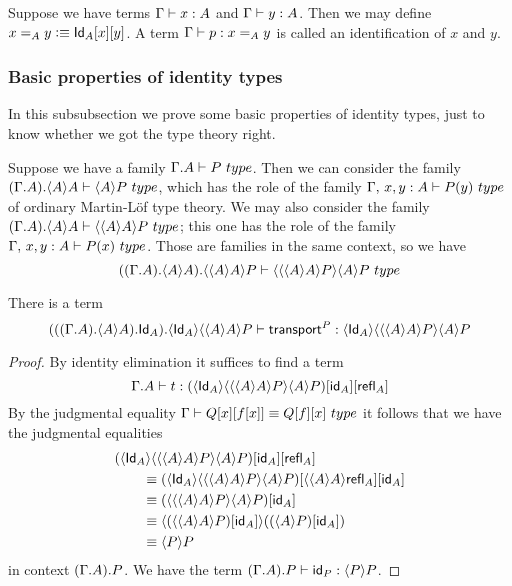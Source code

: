 Suppose we have terms $\jterm{\Gamma}{A}{x}$ and $\jterm{\Gamma}{A}{y}$. Then
we may define $\id[A]{x}{y}\defeq\subst{y}{{x}{\idtypevar{A}}}$. A term
$\jterm{\Gamma}{\id[A]{x}{y}}{p}$ is called an identification of $x$ and $y$.

\subsubsection{Basic properties of identity types}
In this subsubsection we prove some basic properties of identity types, just to
know whether we got the type theory right.

Suppose we have a family $\jtype{\ctxext{\Gamma}{A}}{P}$. Then we can consider
the family $\jtype{\ctxext{{\Gamma}{A}}{\ctxwk{A}{A}}}{\ctxwk{A}{P}}$, which has the role of the family $\jtype{\Gamma,\,x,y:A}{P(y)}$
of ordinary Martin-L\"of type theory. We may also consider the family
$\jtype{\ctxext{{\Gamma}{A}}{\ctxwk{A}{A}}}{\ctxwk{{A}{A}}{P}}$; this one has the
role of the family $\jtype{\Gamma,\,x,y:A}{P(x)}$. Those are families in the
same context, so we have
\begin{equation*}
\jtype{\ctxext{{{\Gamma}{A}}{\ctxwk{A}{A}}}{\ctxwk{{A}{A}}{P}}}{\ctxwk{\ctxwk{{A}{A}}{P}}{{A}{P}}}
\end{equation*}

\begin{lem}
There is a term
\begin{equation*}
\jterm{\ctxext{{{{\Gamma}{A}}{\ctxwk{A}{A}}}{\idtypevar{A}}}{\ctxwk{\idtypevar{A}}{{{A}{A}}{P}}}}{\ctxwk{\idtypevar{A}}{{{{A}{A}}{P}}{{A}{P}}}}{\transfibf{P}}
\end{equation*}
\end{lem}

\begin{proof}
By identity elimination it suffices to find a term
\begin{equation*}
\jterm{\ctxext{\Gamma}{A}}{\subst{\refl{A}}{{\idfunc[A]}{\ctxwk{\idtypevar{A}}{{{{A}{A}}{P}}{{A}{P}}}}}}{t}
\end{equation*}
By the judgmental equality $\jtypeeq{\Gamma}{\subst{{x}{f}}{{x}{Q}}}{\subst{x}{{f}{Q}}}$
it follows that we have the judgmental equalities
\begin{align*}
& \subst{\refl{A}}{{\idfunc[A]}{\ctxwk{\idtypevar{A}}{{{{A}{A}}{P}}{{A}{P}}}}}\\
& \qquad \jdeq \subst{\idfunc[A]}{{\ctxwk{{A}{A}}{\refl{A}}}{\ctxwk{\idtypevar{A}}{{{{A}{A}}{P}}{{A}{P}}}}}\\
& \qquad \jdeq \subst{\idfunc[A]}{\ctxwk{{{A}{A}}{P}}{{A}{P}}}\\
& \qquad \jdeq \ctxwk{\subst{\idfunc[A]}{\ctxwk{{A}{A}}{P}}}{\subst{\idfunc[A]}{\ctxwk{A}{P}}}\\
& \qquad \jdeq \ctxwk{P}{P}
\end{align*}
in context $\ctxext{{\Gamma}{A}}{P}$. We have the term $\jterm{\ctxext{{\Gamma}{A}}{P}}{\ctxwk{P}{P}}{\idfunc[P]}$.
\end{proof}

